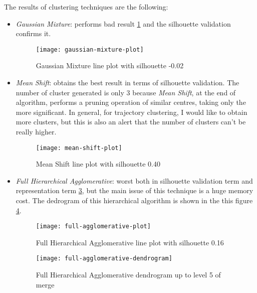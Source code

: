The results of clustering techniques are the following: 

\begin{itemize}
	\item \textit{Gaussian Mixture}: performs bad result \ref{fig:gaussian-mixture-line} and the silhouette validation confirms it.
	
	\begin{figure}[bt]
		\centering
		\texttt{[image: gaussian-mixture-plot]}
		\caption{Gaussian Mixture line plot with silhouette -0.02}
		\label{fig:gaussian-mixture-line}
	\end{figure}

	\item \textit{Mean Shift}: obtains the best result in terms of silhouette validation. The number of cluster generated is only 3 because \textit{Mean Shift}, at the end of algorithm, performs a pruning operation of similar centres, taking only the more significant. In general, for trajectory clustering, I would like to obtain more clusters, but this is also an alert that the number of clusters can't be really higher. 
	
	\begin{figure}[bt]
		\centering
		\texttt{[image: mean-shift-plot]}
		\caption{Mean Shift line plot with silhouette 0.40}
		\label{fig:mean-shift-line}
	\end{figure}

	\item \textit{Full Hierarchical Agglomerative}: worst both in silhouette validation term and representation term \ref{fig:full-agglomerative-line}, but the main issue of this technique is a huge memory cost. The dedrogram of this hierarchical algorithm is shown in the this figure \ref{fig:full-agglomerative-dendrogram}. 
	
	\begin{figure}[bt]
		\centering
		\texttt{[image: full-agglomerative-plot]}
		\caption{Full Hierarchical Agglomerative line plot with silhouette 0.16}
		\label{fig:full-agglomerative-line}
	\end{figure}

	\begin{figure}[bt]
		\centering
		\texttt{[image: full-agglomerative-dendrogram]}
		\caption{Full Hierarchical Agglomerative dendrogram up to level 5 of merge}
		\label{fig:full-agglomerative-dendrogram}
	\end{figure}


\end{itemize}
